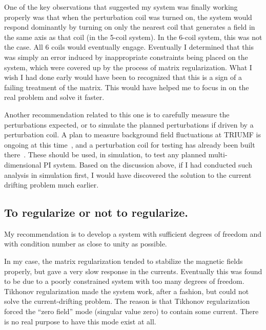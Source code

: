 One of the key observations that suggested my system was finally working properly was that when the perturbation coil was turned on, the system would respond dominantly by turning on only the nearest coil that generates a field in the same axis as that coil (in the 5-coil system). In the 6-coil system, this was not the case.  All 6 coils would eventually engage.  Eventually I determined that this was simply an error induced by inappropriate constraints being placed on the system, which were covered up by the process of matrix regularization. What I wish I had done early would have been to recognized that this is a sign of a failing treatment of the matrix.  This would have helped me to focus in on the real problem and solve it faster.

Another recommendation related to this one is to carefully measure the perturbations expected, or to simulate the planned perturbations if driven by a perturbation coil. A plan to measure background field fluctuations at TRIUMF is ongoing at this time~\cite{beapriv}, and a perturbation coil for testing has already been built there~\cite{smith,cudmore}. These should be used, in simulation, to test any planned multi-dimensional PI system.  Based on the discussion above, if I had conducted such analysis in simulation first, I would have discovered the solution to the current drifting problem much earlier.

\subsection{To regularize or not to regularize.}
 
My recommendation is to develop a system with sufficient degrees of freedom and with condition number as close to unity as possible. 

In my case, the matrix regularization tended to stabilize the magnetic fields properly, but gave a very slow response in the currents. Eventually this was found to be due to a poorly constrained system with too many degrees of freedom. Tikhonov regularization made the system work, after a fashion, but could not solve the current-drifting problem. The reason is that Tikhonov regularization forced the ``zero field'' mode (singular value zero) to contain some current. There is no real purpose to have this mode exist at all.

